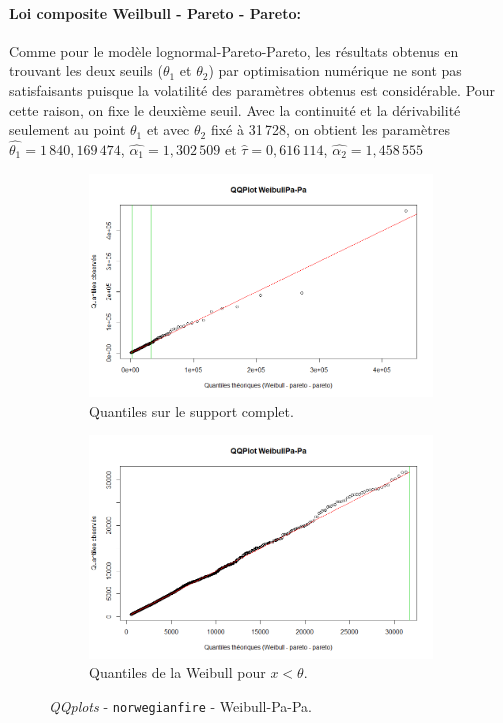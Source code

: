 		\paragraph{Loi composite Weilbull - Pareto - Pareto:} Comme pour le modèle lognormal-Pareto-Pareto, les résultats obtenus en trouvant les deux seuils ($\theta_1$ et $\theta_2$) par optimisation numérique ne sont pas satisfaisants puisque la volatilité des paramètres obtenus est considérable. Pour cette raison, on fixe le deuxième seuil. Avec la continuité et la dérivabilité seulement au point $\theta_1$ et avec $\theta_2$ fixé à 31\,728, on obtient les paramètres $\hat{\theta_1} =1\,840,169\,474$, $\hat{\alpha_1} =  1,302\,509$ et $\hat{\tau}= 0,616\,114$, $\hat{\alpha_2}=1,458\,555$ 
		
		\begin{figure}[H]
			\begin{center}
				\begin{subfigure}[b]{0.45\textwidth}
					\includegraphics[scale=0.35]{Graphiques/QQ_Wei_Pa_Pa_semi} 
					\caption{Quantiles sur le support complet.} \label{QQplot_Wei_PaPa_semi}
				\end{subfigure}
				\begin{subfigure}[b]{0.4\textwidth}
					\includegraphics[scale=0.35]{Graphiques/QQ_Wei_Pa_Pa_semi_t1} 
					\caption{Quantiles de la Weibull pour $x<\theta$.} \label{QQplot_Wei_PaPa_semi_t1}
				\end{subfigure}
				\renewcommand{\figurename}{Illustration}
				\caption{\textit{QQplots} - \texttt{norwegianfire} - Weibull-Pa-Pa.}
			\end{center}
		\end{figure}
